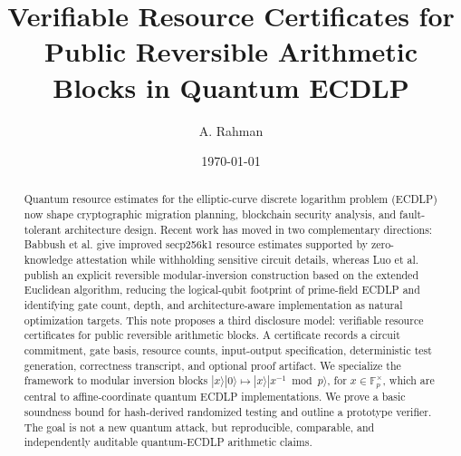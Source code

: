 ﻿\documentclass[11pt]{article}
\title{Verifiable Resource Certificates for Public Reversible Arithmetic Blocks in Quantum ECDLP}
\author{A. Rahman}
\date{\today}
\begin{document}
\maketitle

\begin{abstract}
Quantum resource estimates for the elliptic-curve discrete logarithm problem
(ECDLP) now shape cryptographic migration planning, blockchain security analysis,
and fault-tolerant architecture design. Recent work has moved in two complementary
directions: Babbush et al. give improved secp256k1 resource estimates supported by
zero-knowledge attestation while withholding sensitive circuit details, whereas Luo
et al. publish an explicit reversible modular-inversion construction based on the
extended Euclidean algorithm, reducing the logical-qubit footprint of prime-field
ECDLP and identifying gate count, depth, and architecture-aware implementation as
natural optimization targets. This note proposes a third disclosure model:
verifiable resource certificates for public reversible arithmetic blocks. A
certificate records a circuit commitment, gate basis, resource counts, input-output
specification, deterministic test generation, correctness transcript, and optional
proof artifact. We specialize the framework to modular inversion blocks
\(|x\rangle|0\rangle\mapsto |x\rangle|x^{-1}\bmod p\rangle\), for
\(x\in\mathbb F_p^\times\), which are central to affine-coordinate quantum ECDLP
implementations. We prove a basic soundness bound for hash-derived randomized
testing and outline a prototype verifier. The goal is not a new quantum attack,
but reproducible, comparable, and independently auditable quantum-ECDLP arithmetic
claims.
\end{abstract}

\tableofcontents













\end{document}

